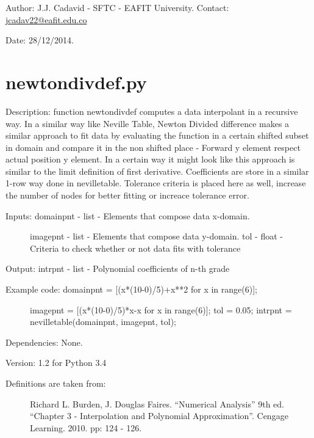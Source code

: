 \documentclass[letterpaper,10pt,oneside]{sphinxmanual}
\theoremstyle{plain}%
\theoremstyle{definition}%
\theoremstyle{remark}%
\begin{document}
Author: J.J. Cadavid - SFTC - EAFIT University.
Contact: \href{mailto:jcadav22@eafit.edu.co}{jcadav22@eafit.edu.co}

Date: 28/12/2014.


\section{newtondivdef.py}
\label{code:newtondivdef-py}\label{code:module-newtondivdef}
Description: function newtondivdef computes a data interpolant in a recursive
way. In a similar way like Neville Table, Newton Divided difference makes
a similar approach to fit data by evaluating the function in a certain
shifted subset in domain and compare it in the non shifted place - Forward
y element respect actual position y element. In a certain way it might look
like this approach is similar to the limit definition of first derivative.
Coefficients are store in a similar 1-row way done in nevilletable. Tolerance
criteria is placed here as well, increase the number of nodes for better 
fitting or increace tolerance error.
\begin{description}
\item[{Inputs: domainpnt - list - Elements that compose data x-domain. }] \leavevmode
imagepnt - list - Elements that compose data y-domain.
tol - float - Criteria to check whether or not data fits with tolerance

\end{description}

Output: intrpnt - list - Polynomial coefficients of n-th grade
\begin{description}
\item[{Example code: domainpnt = {[}(x*(10-0)/5)+x**2 for x in range(6){]};}] \leavevmode
imagepnt = {[}(x*(10-0)/5)*x-x for x in range(6){]};
tol = 0.05;
intrpnt = nevilletable(domainpnt, imagepnt, tol);

\end{description}

Dependencies: None.

Version: 1.2 for Python 3.4
\begin{description}
\item[{Definitions are taken from:}] \leavevmode
Richard L. Burden, J. Douglas Faires. ``Numerical Analysis'' 9th ed.
``Chapter 3 - Interpolation and Polynomial Approximation''. 
Cengage Learning. 2010. pp: 124 - 126.

\end{description}
\end{document}
